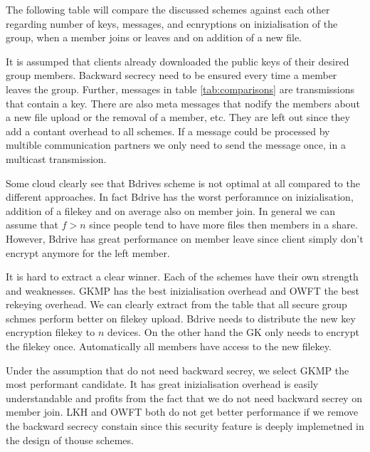 The following table will compare the discussed schemes against each other regarding number of keys, messages, and ecnryptions on inizialisation of the group, when a member joins or leaves and on addition of a new file. 

It is assumped that clients already downloaded the public keys of their desired group members. Backward secrecy need to be ensured every time a member leaves the group.
Further, messages in table \ref{tab:comparisons} are transmissions that contain a key. There are also meta messages that nodify the members about a new file upload or the removal of a member, etc. They are left out since they add a contant overhead to all schemes.  If a message could be processed by multible communication partners we only need to send the message once, in a multicast transmission.

Some cloud clearly see that Bdrives scheme is not optimal at all compared to the different approaches. In fact Bdrive has the worst perforamnce on inizialisation, addition of a filekey and on average also on member join. In general we can assume that $f > n$ since people tend to have more files then members in a share. However, Bdrive has great performance on member leave since client simply don't encrypt anymore for the left member.

It is hard to extract a clear winner. Each of the schemes have their own strength and weaknesses. \ac{GKMP} has the best inizialisation overhead and \ac{OWFT} the best rekeying overhead. We can clearly extract from the table that all secure group schmes perform better on filekey upload. Bdrive needs to distribute the new key encryption filekey to $n$ devices. On the other hand the \ac{GK} only needs to encrypt the filekey once. Automatically all members have access to the new filekey. 

Under the assumption that do not need backward secrey, we select \ac{GKMP} the most performant candidate. It has great inizialisation overhead is easily understandable and profits from the fact that we do not need backward secrey on member join. \ac{LKH} and \ac{OWFT} both do not get better performance if we remove the backward secrecy constain since this security feature is deeply implemetned in the design of thouse schemes. 